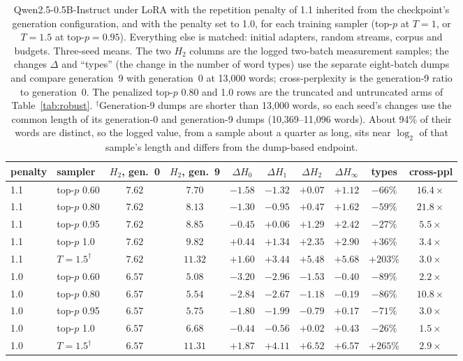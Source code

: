 \documentclass[10pt]{article}
\theoremstyle{plain}
\theoremstyle{definition}
\newcommand{\Htwo}{H_2}
\newcommand{\Hz}{H_0}
\newcommand{\Hinf}{H_\infty}
\begin{document}
\begin{table}[ht]
\centering\small
\caption{Qwen2.5-0.5B-Instruct under LoRA with the repetition penalty of 1.1 inherited from the
checkpoint's generation configuration, and with the penalty set to 1.0, for each training sampler
(top-$p$ at $T=1$, or $T=1.5$ at top-$p=0.95$). Everything else is matched: initial adapters,
random streams, corpus and budgets. Three-seed means. The two $\Htwo$ columns are the logged two-batch
measurement samples; the changes $\Delta$ and ``types'' (the change in the number of word types)
use the separate eight-batch dumps and compare generation~9 with generation~0 at 13,000 words;
cross-perplexity is the generation-9 ratio to generation~0. The penalized top-$p$ 0.80 and 1.0
rows are the truncated and untruncated arms of Table~\ref{tab:robust}. $^\dagger$Generation-9 dumps
are shorter than 13,000 words, so each seed's changes use the common length of its generation-0
and generation-9 dumps (10,369--11,096 words). About 94\% of their words are distinct, so the
logged value, from a sample about a quarter as long, sits near $\log_2$ of that sample's length
and differs from the dump-based endpoint.}
\label{tab:qwenrp}
\setlength{\tabcolsep}{4.5pt}
\begin{tabular}{llcccccccc}
\toprule
penalty & sampler & $\Htwo$, gen.~0 & $\Htwo$, gen.~9 & $\Delta\Hz$ & $\Delta H_1$ & $\Delta\Htwo$ & $\Delta\Hinf$ & types & cross-ppl \\
\midrule
1.1 & top-$p$ 0.60 & $7.62$ & $7.70$ & $-1.58$ & $-1.32$ & $+0.07$ & $+1.12$ & $-66\%$ & $16.4\times$ \\
1.1 & top-$p$ 0.80 & $7.62$ & $8.13$ & $-1.30$ & $-0.95$ & $+0.47$ & $+1.62$ & $-59\%$ & $21.8\times$ \\
1.1 & top-$p$ 0.95 & $7.62$ & $8.85$ & $-0.45$ & $+0.06$ & $+1.29$ & $+2.42$ & $-27\%$ & $5.5\times$ \\
1.1 & top-$p$ 1.0 & $7.62$ & $9.82$ & $+0.44$ & $+1.34$ & $+2.35$ & $+2.90$ & $+36\%$ & $3.4\times$ \\
1.1 & $T=1.5^\dagger$ & $7.62$ & $11.32$ & $+1.60$ & $+3.44$ & $+5.48$ & $+5.68$ & $+203\%$ & $3.0\times$ \\
\midrule
1.0 & top-$p$ 0.60 & $6.57$ & $5.08$ & $-3.20$ & $-2.96$ & $-1.53$ & $-0.40$ & $-89\%$ & $2.2\times$ \\
1.0 & top-$p$ 0.80 & $6.57$ & $5.54$ & $-2.84$ & $-2.67$ & $-1.18$ & $-0.19$ & $-86\%$ & $10.8\times$ \\
1.0 & top-$p$ 0.95 & $6.57$ & $5.75$ & $-1.80$ & $-1.99$ & $-0.79$ & $+0.17$ & $-71\%$ & $3.0\times$ \\
1.0 & top-$p$ 1.0 & $6.57$ & $6.68$ & $-0.44$ & $-0.56$ & $+0.02$ & $+0.43$ & $-26\%$ & $1.5\times$ \\
1.0 & $T=1.5^\dagger$ & $6.57$ & $11.31$ & $+1.87$ & $+4.11$ & $+6.52$ & $+6.57$ & $+265\%$ & $2.9\times$ \\
\bottomrule
\end{tabular}
\end{table}
\end{document}
